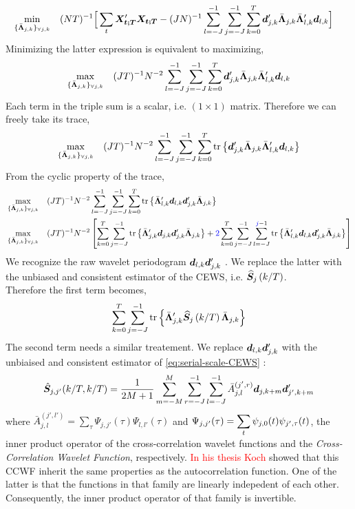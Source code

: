 \documentclass[main_document.tex]{subfiles}
\begin{document}
\begin{align*}
	\min_{\setOptLoadings} \quad (NT)^{-1} \Big[ \sum_t \X{t}'\X{t} &- (JN)^{-1}\scalesum{l} \scalesum{j} \locsum{k} \coeffs{j}{k}' \optLoadings{j}{k}\optLoadings{l}{k}' \coeffs{l}{k}\Big]
\end{align*}
Minimizing the latter expression is equivalent to maximizing, 
\begin{align*}
	\max_{\setOptLoadings} \quad (JT)^{-1}N^{-2}\scalesum{l} \scalesum{j} \locsum{k} \coeffs{j}{k}' \optLoadings{j}{k}\optLoadings{l}{k}' \coeffs{l}{k}
\end{align*}
Each term in the triple sum is a scalar, i.e. $(1 \times 1)$ matrix. Therefore we can freely take its trace, 
\begin{align*}
	\max_{\setOptLoadings} \quad (JT)^{-1}N^{-2}\scalesum{l} \scalesum{j} \locsum{k} \mathrm{tr} \left \{\coeffs{j}{k}' \optLoadings{j}{k}\optLoadings{l}{k}' \coeffs{l}{k}\right \}
\end{align*}
From the cyclic property of the trace, 
\begin{align*}
	&\max_{\setOptLoadings} \quad (JT)^{-1}N^{-2}\scalesum{l} \scalesum{j} \locsum{k} \mathrm{tr} \left \{\optLoadings{l}{k}' \coeffs{l}{k} \coeffs{j}{k}' \optLoadings{j}{k} \right \}\\
	&\max_{\setOptLoadings} \quad (JT)^{-1}N^{-2} \left[ \locsum{k} \scalesum{j} \mathrm{tr} \left \{\optLoadings{j}{k}' \coeffs{j}{k} \coeffs{j}{k}' \optLoadings{j}{k} \right \} + \textcolor{blue}{2} \locsum{k} \scalesum{j} \sum_{l=-J}^{\textcolor{blue}{j}-1} \mathrm{tr} \left \{\optLoadings{l}{k}' \coeffs{l}{k} \coeffs{j}{k}' \optLoadings{j}{k} \right \} \right]
\end{align*}
We recognize the raw wavelet periodogram $\bm{d}_{l,k} \bm{d}_{j,k}'$ . We replace the latter with the unbiased and consistent estimator of the CEWS, i.e. $\widehat{\bm{S}}_{j}\left(k/T\right)$. \\
Therefore the first term becomes, 
\begin{align*}
	\locsum{k} \scalesum{j} \mathrm{tr} \left \{\optLoadings{j}{k}' \estimCEWS{j}{k} \optLoadings{j}{k} \right \}
\end{align*}
The second term needs a similar treatement. We replace $\bm{d}_{l,k} \bm{d}_{j,k}'$ with the unbiaised and consistent estimator of \eqref{eq:serial-scale-CEWS} : 
\begin{align}
	\Hat{\bm{S}}_{j,j'}(k/T, k/T) = \frac{\displaystyle 1}{\displaystyle 2M+1} \sum_{m=-M}^{M}\sum_{r=-J}^{-1} \sum_{l=-J}^{-1} \bar{A}_{j,l}^{(j',r)} \coeffs{j}{k+m} \coeffs{j'}{k+m}'
\end{align}
where $\bar{A}_{j,l}^{(j',l')} = \sum_{\tau}\Psi_{j,j'}(\tau)\Psi_{l,l'}(\tau)$ and $\Psi_{j,j'}(\tau) = \sum_{t} \wavelet{j}{0}{t}\wavelet{j'}{\tau}{t}$, the inner product operator of the cross-correlation wavelet functions and the \emph{Cross-Correlation Wavelet Function}, respectively. \textcolor{red}{In his thesis Koch} showed that this CCWF inherit the same properties as the autocorrelation function. One of the latter is that the functions in that family are linearly indepedent of each other. Consequently, the inner product operator of that family is invertible.  \\
\end{document}
